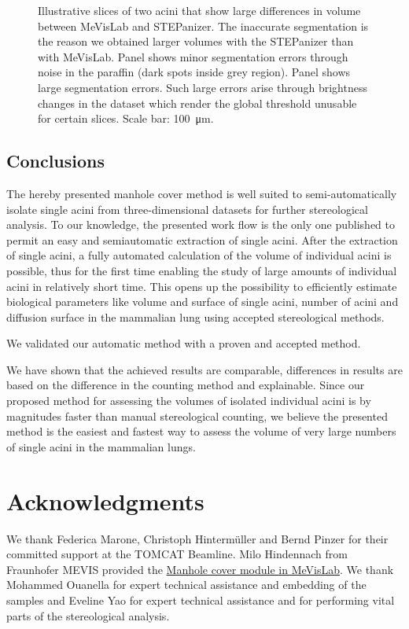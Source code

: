 \documentclass[paper=a4,abstract=true,english,DIV=calc]{scrartcl}
\begin{document}
\begin{figure}
{		\label{subfig:60e_acinus38}%
	}%
	\hfill%
	\caption{Illustrative slices of two acini that show large differences in volume between MeVisLab and STEPanizer.
		The inaccurate segmentation is the reason we obtained larger volumes with the STEPanizer than with MeVisLab.
		Panel \protect{} shows minor segmentation errors through noise in the paraffin (dark spots inside grey region).
		Panel \protect{} shows large segmentation errors.
		Such large errors arise through brightness changes in the dataset which render the global threshold unusable for certain slices.
		Scale bar: \SI{100}{\micro\meter}.}
	\label{fig:MeVisSegmentation}
\end{figure}

\subsection{Conclusions}
The hereby presented manhole cover method is well suited to semi-automatically isolate single acini from three-dimensional datasets for further stereological analysis.
To our knowledge, the presented work flow is the only one published to permit an easy and semiautomatic extraction of single acini.
After the extraction of single acini, a fully automated calculation of the volume of individual acini is possible, thus for the first time enabling the study of large amounts of individual acini in relatively short time.
This opens up the possibility to efficiently estimate biological parameters like volume and surface of single acini, number of acini and diffusion surface in the mammalian lung using accepted stereological methods.

We validated our automatic method with a proven and accepted method.

We have shown that the achieved results are comparable, differences in results are based on the difference in the counting method and explainable.
Since our proposed method for assessing the volumes of isolated individual acini is by magnitudes faster than manual stereological counting, we believe the presented method is the easiest and fastest way to assess the volume of very large numbers of single acini in the mammalian lungs.

\clearpage
\section{Acknowledgments}
We thank Federica Marone, Christoph Hintermüller and Bernd Pinzer for their committed support at the TOMCAT Beamline.
Milo Hindennach from Fraunhofer MEVIS provided the \href{http://www.mevis-research.de/cgi-bin/discus/board-auth.cgi?lm=1282233250&file=/839/11760.html}{Manhole cover module in MeVisLab}.
We thank Mohammed Ouanella for expert technical assistance and embedding of the samples and Eveline Yao for expert technical assistance and for performing vital parts of the stereological analysis.
\end{document}
